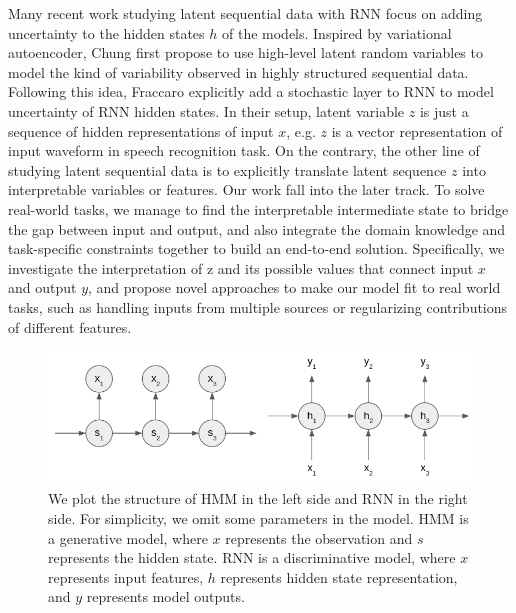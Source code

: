 Many recent work studying latent sequential data with RNN focus on adding uncertainty to the hidden states $h$ of the models. Inspired by variational autoencoder, Chung \cite{chung2015recurrent} first propose to use high-level latent random variables to model the kind of variability observed in highly structured sequential data. Following this idea, Fraccaro \cite{fraccaro2016sequential} explicitly add a stochastic layer to RNN to model uncertainty of RNN hidden states. In their setup, latent variable $z$ is just a sequence of hidden representations of input $x$, e.g. $z$ is a vector representation of input waveform in speech recognition task. On the contrary, the other line of studying latent sequential data is to explicitly translate latent sequence $z$ into interpretable variables or features. Our work fall into the later track. To solve real-world tasks, we manage to find the interpretable intermediate state to bridge the gap between input and output, and also integrate the domain knowledge and task-specific constraints together to build an end-to-end solution. Specifically, we investigate the interpretation of z and its possible values that connect input $x$ and output $y$, and propose novel approaches to make our model fit to real world tasks, such as handling inputs from multiple sources or regularizing contributions of different features.

\begin{figure}[t] 
\centering
\includegraphics[width=1.0\columnwidth]{Images/rnn_hmm.png} 
  \caption{We plot the structure of HMM in the left side and RNN in the right side. For simplicity, we omit some parameters in the model. HMM is a generative model, where $x$ represents the observation and $s$ represents the hidden state. RNN is a discriminative model, where $x$ represents input features, $h$ represents hidden state representation, and $y$ represents model outputs.}
\end{figure}\label{fig:model_c2} 




